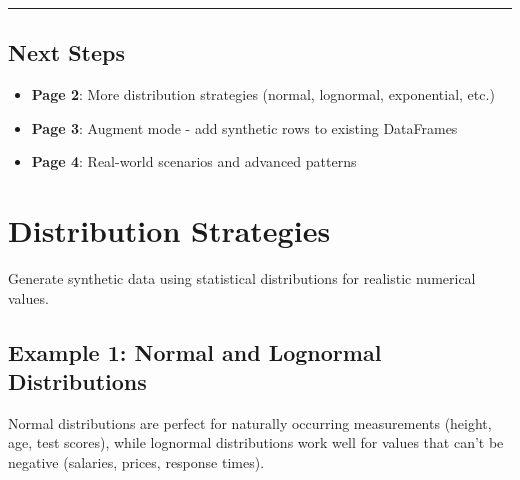 \documentclass[
  letterpaper,
]{scrbook}
\providecommand{\tightlist}{%
  \setlength{\itemsep}{0pt}\setlength{\parskip}{0pt}}
\begin{document}
\begin{center}\rule{0.5\linewidth}{0.5pt}\end{center}

\section{Next Steps}\label{next-steps-12}

\begin{itemize}
\tightlist
\item
  \textbf{Page 2}: More distribution strategies (normal, lognormal,
  exponential, etc.)
\item
  \textbf{Page 3}: Augment mode - add synthetic rows to existing
  DataFrames
\item
  \textbf{Page 4}: Real-world scenarios and advanced patterns
\end{itemize}

\chapter{Distribution Strategies}\label{distribution-strategies}

Generate synthetic data using statistical distributions for realistic
numerical values.

\section{Example 1: Normal and Lognormal
Distributions}\label{example-1-normal-and-lognormal-distributions}

Normal distributions are perfect for naturally occurring measurements
(height, age, test scores), while lognormal distributions work well for
values that can't be negative (salaries, prices, response times).
\end{document}
